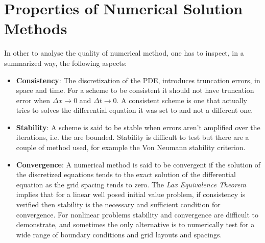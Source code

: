  \section{Properties of Numerical Solution Methods}
 In other to analyse the quality of numerical method, one has to inspect, in a summarized way, the following aspects:

 \begin{itemize}
 \item \textbf{Consistency}: The discretization of the PDE, introduces truncation errors, in space and time. For a scheme to be consistent it should not have truncation error when $\Delta x  \rightarrow 0$  and $\Delta t \rightarrow 0$. A consistent scheme is one that actually tries to solves the differential equation it was set to and not a different one.

 \item \textbf{Stability}: A scheme is said to be stable when errors aren't amplified over the iterations, i.e. the are bounded. Stability is difficult to test but there are a couple of method used, for example the Von Neumann stability criterion.

 \item \textbf{Convergence}: A numerical method is said to be convergent if the solution of the discretized equations tends to the exact solution of the differential equation as the grid spacing tends to zero. The \emph{Lax Equivalence Theorem} implies that for a linear well posed initial value problem, if consistency is verified then stability is the necessary and sufficient condition for convergence. 
 For nonlinear problems stability and convergence are difficult to demonstrate, and sometimes the only alternative is to numerically test for a wide range of boundary conditions and grid layouts and spacings. 


\end{itemize}
